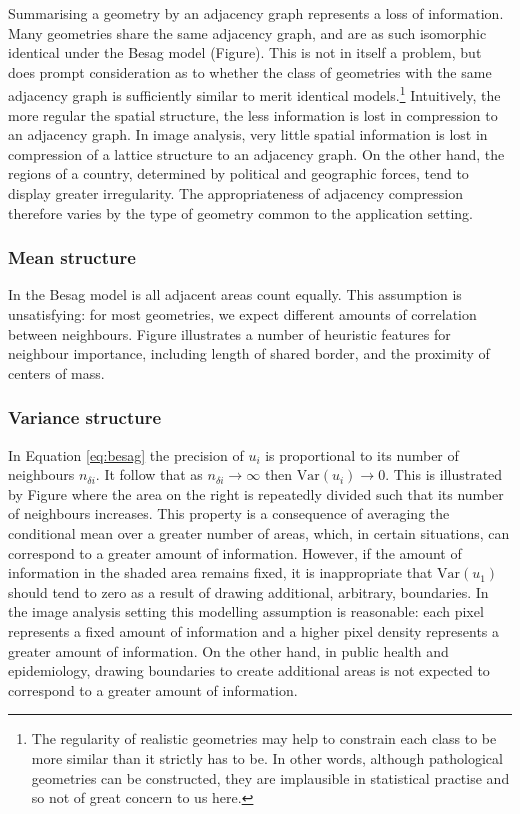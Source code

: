 \documentclass[a4paper, nobind]{templates/ociamthesis}
\begin{document}
Summarising a geometry by an adjacency graph represents a loss of information.
Many geometries share the same adjacency graph, and are as such isomorphic identical under the Besag model (Figure).
This is not in itself a problem, but does prompt consideration as to whether the class of geometries with the same adjacency graph is sufficiently similar to merit identical models.\footnote{The regularity of realistic geometries may help to constrain each class to be more similar than it strictly has to be. In other words, although pathological geometries can be constructed, they are implausible in statistical practise and so not of great concern to us here.}
Intuitively, the more regular the spatial structure, the less information is lost in compression to an adjacency graph.
In image analysis, very little spatial information is lost in compression of a lattice structure to an adjacency graph.
On the other hand, the regions of a country, determined by political and geographic forces, tend to display greater irregularity.
The appropriateness of adjacency compression therefore varies by the type of geometry common to the application setting.

\hypertarget{mean-structure}{%
\subsubsection{Mean structure}\label{mean-structure}}

In the Besag model is all adjacent areas count equally.
This assumption is unsatisfying: for most geometries, we expect different amounts of correlation between neighbours.
Figure illustrates a number of heuristic features for neighbour importance, including length of shared border, and the proximity of centers of mass.

\hypertarget{variance-structure}{%
\subsubsection{Variance structure}\label{variance-structure}}

In Equation \eqref{eq:besag} the precision of \(u_i\) is proportional to its number of neighbours \(n_{\delta i}\).
It follow that as \(n_{\delta i} \to \infty\) then \(\text{Var}(u_i) \to 0\).
This is illustrated by Figure where the area on the right is repeatedly divided such that its number of neighbours increases.
This property is a consequence of averaging the conditional mean over a greater number of areas, which, in certain situations, can correspond to a greater amount of information.
However, if the amount of information in the shaded area remains fixed, it is inappropriate that \(\text{Var}(u_1)\) should tend to zero as a result of drawing additional, arbitrary, boundaries.
In the image analysis setting this modelling assumption is reasonable: each pixel represents a fixed amount of information and a higher pixel density represents a greater amount of information.
On the other hand, in public health and epidemiology, drawing boundaries to create additional areas is not expected to correspond to a greater amount of information.
\end{document}
